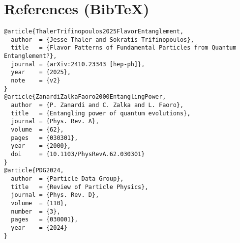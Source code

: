 \documentclass[11pt]{article}
\begin{document}
  \section*{References (Bib\TeX)}
  \begin{verbatim}
@article{ThalerTrifinopoulos2025FlavorEntanglement,
  author  = {Jesse Thaler and Sokratis Trifinopoulos},
  title   = {Flavor Patterns of Fundamental Particles from Quantum Entanglement?},
  journal = {arXiv:2410.23343 [hep-ph]},
  year    = {2025},
  note    = {v2}
}
@article{ZanardiZalkaFaoro2000EntanglingPower,
  author  = {P. Zanardi and C. Zalka and L. Faoro},
  title   = {Entangling power of quantum evolutions},
  journal = {Phys. Rev. A},
  volume  = {62},
  pages   = {030301},
  year    = {2000},
  doi     = {10.1103/PhysRevA.62.030301}
}
@article{PDG2024,
  author  = {Particle Data Group},
  title   = {Review of Particle Physics},
  journal = {Phys. Rev. D},
  volume  = {110},
  number  = {3},
  pages   = {030001},
  year    = {2024}
}
  \end{verbatim}




  \ifdefined\standalonechapter\else
  
\end{document}
